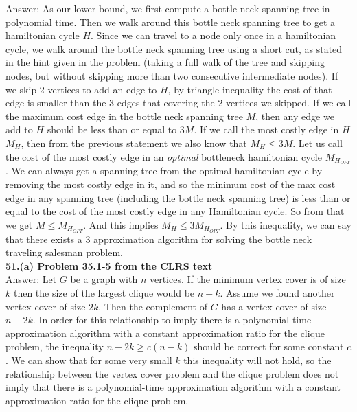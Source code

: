 \documentclass{article}
\begin{document}
Answer: As our lower bound, we first compute a bottle neck spanning tree in polynomial time. Then we walk around this bottle neck spanning tree to get a hamiltonian cycle $H$. Since we can travel to a node only once in a hamiltonian cycle, we walk around the bottle neck spanning tree using a short cut, as stated in the hint given in the problem (taking a full walk of the tree and skipping nodes, but without skipping more than two consecutive intermediate nodes). If we skip 2 vertices to add an edge to $H$, by triangle inequality the cost of that edge is smaller than the 3 edges that covering the 2 vertices we skipped. If we call the maximum cost edge in the bottle neck spanning tree $M$, then any edge we add to $H$ should be less than or equal to $3M$. If we call the most costly edge in $H$ $M_H$, then from the previous statement we also know that $M_H \leq 3M$. Let us call the cost of the most costly edge in an \textit{optimal} bottleneck hamiltonian cycle $M_{H_{OPT}}$.  We can always get a spanning tree from the optimal hamiltonian cycle by removing the most costly edge in it, and so the minimum cost of the max cost edge in any spanning tree (including the bottle neck spanning tree) is less than or equal to the cost of the most costly edge in any Hamiltonian cycle. So from that we get $M \leq M_{H_{OPT}}$. And this implies $M_H \leq 3 M_{H_{OPT}}$. By this inequality, we can say that there exists a 3 approximation algorithm for solving the bottle neck traveling salesman problem. \\ \newline
\textbf{51.(a) Problem 35.1-5 from the CLRS text} \\ \newline
Answer:  Let $G$ be a graph with $n$ vertices. If the minimum vertex cover is of size $k$ then the size of the largest clique would be $n - k$. Assume we found another vertex cover of size $2k$. Then the complement of $G$ has a vertex cover of size $n - 2k$. In order for this relationship to imply there is a polynomial-time approximation algorithm with a constant approximation ratio for the clique problem, the inequality $n - 2k \geq c(n - k)$ should be correct for some constant $c$. We can show that for some very small $k$ this inequality will not hold, so the relationship between the vertex cover problem and the clique problem does not imply that there is a polynomial-time approximation algorithm with a constant approximation ratio for the clique problem. \\ \newline
\end{document}
